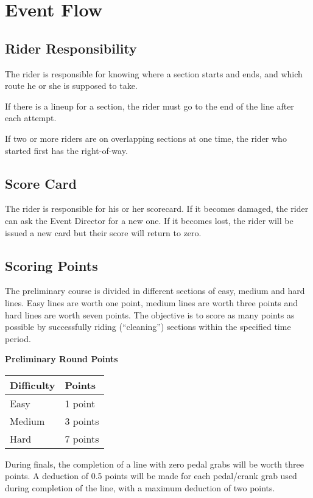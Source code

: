 \section{Event Flow}

\subsection{Rider Responsibility}

The rider is responsible for knowing where a section starts and ends, and which route he or she is supposed to take.

If there is a lineup for a section, the rider must go to the end of the line after each attempt.

If two or more riders are on overlapping sections at one time, the rider who started first has the right-of-way.


\subsection{Score Card}
The rider is responsible for his or her scorecard.
If it becomes damaged, the rider can ask the Event Director for a new one.
If it becomes lost, the rider will be issued a new card but their score will return to zero.

\subsection{Scoring Points}
The preliminary course is divided in different sections of easy, medium and hard lines.
Easy lines are worth one point, medium lines are worth three points and hard lines are worth seven points.
The objective is to score as many points as possible by successfully riding (``cleaning'') sections within the specified time period.

\textbf{Preliminary Round Points}

\begin{tabular}{|l|l|}
\hline
\textbf{Difficulty} & \textbf{Points}\\
\hline
Easy & 1 point\\
\hline
Medium & 3 points\\
\hline
Hard & 7 points\\
\hline
\end{tabular}

During finals, the completion of a line with zero pedal grabs will be worth three points.
A deduction of 0.5 points will be made for each pedal/crank grab used during completion of the line, with a maximum deduction of two points.

